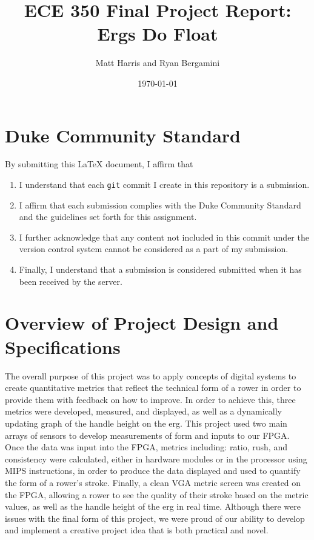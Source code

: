 \documentclass[letterpaper]{article} %
\begin{document}
\title{ECE 350 Final Project Report: Ergs Do Float}
\author{Matt Harris and Ryan Bergamini} %
\date{\today} %
\maketitle

\section*{Duke Community Standard}

By submitting this \LaTeX{} document, I affirm that
\begin{enumerate}
    \item I understand that each \texttt{git} commit I create in this repository is a submission.
    \item I affirm that each submission complies with the Duke Community Standard and the guidelines set forth for this assignment.
    \item I further acknowledge that any content not included in this commit under the version control system cannot be considered as a part of my submission.
    \item Finally, I understand that a submission is considered submitted when it has been received by the server.
\end{enumerate}
\clearpage

\section{Overview of Project Design and Specifications}
The overall purpose of this project was to apply concepts of digital systems to create quantitative metrics that reflect the technical form of a rower in order to provide them with feedback on how to improve. In order to achieve this, three metrics were developed, measured, and displayed, as well as a dynamically updating graph of the handle height on the erg.
This project used two main arrays of sensors to develop measurements of form and inputs to our FPGA. Once the data was input into the FPGA, metrics including: ratio, rush, and consistency were calculated, either in hardware modules or in the processor using MIPS instructions, in order to produce the data displayed and used to quantify the form of a rower's stroke. Finally, a clean VGA metric screen was created on the FPGA, allowing a rower to see the quality of their stroke based on the metric values, as well as the handle height of the erg in real time. Although there were issues with the final form of this project, we were proud of our ability to develop and implement a creative project idea that is both practical and novel.
\end{document}
